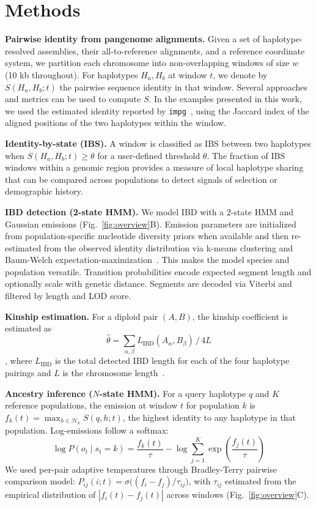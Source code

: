 \documentclass[10pt,twocolumn]{article}
\begin{document}
\section{Methods}

\textbf{Pairwise identity from pangenome alignments.}
Given a set of haplotype-resolved assemblies, their all-to-reference alignments, and a reference coordinate system, we partition each chromosome into non-overlapping windows of size $w$ (10 kb throughout). For haplotypes $H_a, H_b$ at window $t$, we denote by $S(H_a, H_b; t)$ the pairwise sequence identity in that window. Several approaches and metrics can be used to compute $S$. In the examples presented in this work, we used the estimated identity reported by \texttt{impg}~\cite{impg}, using the Jaccard index of the aligned positions of the two haplotypes within the window.

  \textbf{Identity-by-state (IBS).}
  A window is classified as IBS between two haplotypes when $S(H_a, H_b; t) \geq \theta$ for a user-defined threshold $\theta$. The fraction of IBS windows within a genomic region provides a measure of local haplotype sharing that can be compared across populations to detect signals of selection or demographic history.


\textbf{IBD detection (2-state HMM).}
 We model IBD with a 2-state HMM and Gaussian emissions (Fig.~\ref{fig:overview}B). Emission parameters are initialized from population-specific nucleotide diversity priors when available and then re-estimated from the observed identity distribution via k-means clustering and Baum-Welch expectation-maximization~\cite{baum1970maximization}. This makes the model species and population versatile. Transition probabilities encode expected segment length and optionally scale with genetic distance. Segments are decoded via Viterbi and filtered by length and LOD score.

  \textbf{Kinship estimation.}
For a diploid pair $(A, B)$, the kinship coefficient is estimated as $$\hat{\theta} = \sum_{\alpha,\beta} L_{\text{IBD}}(A_\alpha, B_\beta)\, /\, 4L$$, where $L_{\text{IBD}}$ is the total detected IBD length for each of the four haplotype pairings and $L$ is the chromosome length~\cite{thompson2013ibd}.

\textbf{Ancestry inference ($N$-state HMM).}
For a query haplotype $q$ and $K$ reference populations, the emission at window $t$ for population $k$ is $f_k(t) = \max_{h \in \mathcal{H}_k} S(q, h; t)$, the highest identity to any haplotype in that population. Log-emissions follow a softmax:
$$\log P(o_t \mid s_t{=}k) = \frac{f_k(t)}{\tau} - \log \sum_{j=1}^{K}
\exp\!\left(\frac{f_j(t)}{\tau}\right)  $$
 We used per-pair adaptive temperatures through Bradley-Terry pairwise comparison model: $P_{ij}(i;t) = \sigma\bigl((f_i{-}f_j)/\tau_{ij}\bigr)$, with $\tau_{ij}$ estimated from the empirical distribution of $|f_i(t){-}f_j(t)|$ across windows (Fig.~\ref{fig:overview}C).
\end{document}
